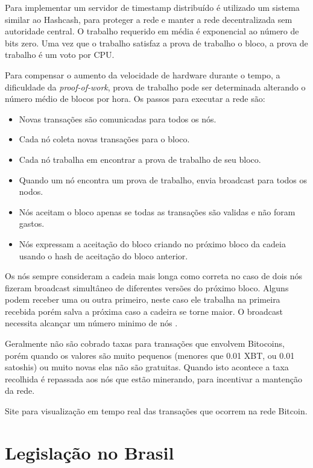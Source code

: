 \documentclass[a4paper,11pt]{article}
\theoremstyle{mytheor}
\begin{document}
Para implementar um servidor de timestamp distribuído é utilizado um sistema similar ao Hashcash, para proteger a rede e manter a rede decentralizada sem autoridade central. O trabalho requerido em média é exponencial ao número de bits zero. Uma vez que o trabalho satisfaz a prova de trabalho o bloco, a prova de trabalho é um voto por CPU.

Para compensar o aumento da velocidade de hardware durante o tempo, a dificuldade da \textit{proof-of-work}, prova de trabalho pode ser determinada alterando o número médio de blocos por hora. Os passos para executar a rede são:
\begin{itemize}
    \item Novas transações são comunicadas para todos os nós.
    \item Cada nó coleta novas transações para o bloco.
    \item Cada nó trabalha em encontrar a prova de trabalho de seu bloco.
    \item Quando um nó encontra um prova de trabalho, envia broadcast para todos os nodos.
    \item Nós aceitam o bloco apenas se todas as transações são validas e não foram gastos.
    \item Nós expressam a aceitação do bloco criando no próximo bloco da cadeia usando o hash de aceitação do bloco anterior.
\end{itemize}

Os nós sempre consideram a cadeia mais longa como correta no caso de dois nós fizeram broadcast simultâneo de diferentes versões do próximo bloco. Alguns podem receber uma ou outra primeiro, neste caso ele trabalha na primeira recebida porém salva a próxima caso a cadeira se torne maior. O broadcast necessita alcançar um número minimo de nós \cite{nakamoto2008bitcoin}.

Geralmente não são cobrado taxas para transações que envolvem Bitocoins, porém quando os valores são muito pequenos (menores que 0.01 XBT, ou 0.01 satoshis) ou muito novas elas não são gratuitas. Quando isto acontece a taxa recolhida é repassada aos nós que estão minerando, para incentivar a mantenção da rede.

Site para visualização em tempo real das transações que ocorrem \cite{realTime} na rede Bitcoin.

\section*{Legislação no Brasil}
\end{document}
